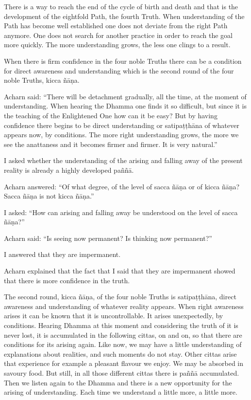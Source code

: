 There is a way to reach the end of the cycle of birth and death and that
is the development of the eightfold Path, the fourth Truth. When
understanding of the Path has become well established one does not
deviate from the right Path anymore. One does not search for another
practice in order to reach the goal more quickly. The more understanding
grows, the less one clings to a result.

When there is firm confidence in the four noble Truths there can be a
condition for direct awareness and understanding which is the second
round of the four noble Truths, kicca ñāṇa.

Acharn said: ``There will be detachment gradually, all the time, at the
moment of understanding. When hearing the Dhamma one finds it so
difficult, but since it is the teaching of the Enlightened One how can
it be easy? But by having confidence there begins to be direct
understanding or satipaṭṭhāna of whatever appears now, by conditions.
The more right understanding grows, the more we see the anattaness and
it becomes firmer and firmer. It is very natural.''

I asked whether the understanding of the arising and falling away of the
present reality is already a highly developed paññā.

Acharn answered: ``Of what degree, of the level of sacca ñāṇa or of
kicca ñāṇa? Sacca ñāṇa is not kicca ñāṇa.''

I asked: ``How can arising and falling away be understood on the level
of sacca ñāṇa?''

Acharn said: ``Is seeing now permanent? Is thinking now permanent?''

I answered that they are impermanent.

Acharn explained that the fact that I said that they are impermanent
showed that there is more confidence in the truth.

The second round, kicca ñāṇa, of the four noble Truths is satipaṭṭhāna,
direct awareness and understanding of whatever reality appears. When
right awareness arises it can be known that it is uncontrollable. It
arises unexpectedly, by conditions. Hearing Dhamma at this moment and
considering the truth of it is never lost, it is accumulated in the
following cittas, on and on, so that there are conditions for its
arising again. Like now, we may have a little understanding of
explanations about realities, and such moments do not stay. Other cittas
arise that experience for example a pleasant flavour we enjoy. We may be
absorbed in savoury food. But still, in all those different cittas there
is paññā accumulated. Then we listen again to the Dhamma and there is a
new opportunity for the arising of understanding. Each time we
understand a little more, a little more.

